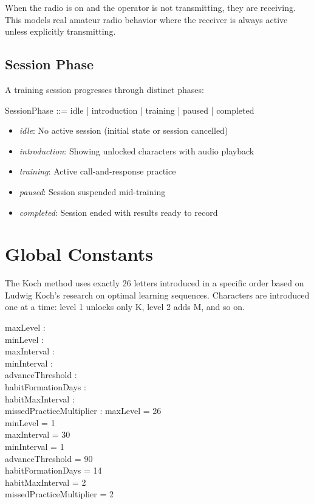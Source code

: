 \documentclass[a4paper,10pt,fleqn]{article}
\begin{document}
When the radio is on and the operator is not transmitting, they are receiving.
This models real amateur radio behavior where the receiver is always active
unless explicitly transmitting.

\subsection{Session Phase}

A training session progresses through distinct phases:

\begin{zed}
SessionPhase ::= idle | introduction | training | paused | completed
\end{zed}

\begin{itemize}
\item \emph{idle}: No active session (initial state or session cancelled)
\item \emph{introduction}: Showing unlocked characters with audio playback
\item \emph{training}: Active call-and-response practice
\item \emph{paused}: Session suspended mid-training
\item \emph{completed}: Session ended with results ready to record
\end{itemize}

\section{Global Constants}

The Koch method uses exactly 26 letters introduced in a specific order based on
Ludwig Koch's research on optimal learning sequences. Characters are introduced
one at a time: level 1 unlocks only K, level 2 adds M, and so on.

\begin{axdef}
maxLevel : \nat \\
minLevel : \nat \\
maxInterval : \nat \\
minInterval : \nat \\
advanceThreshold : \nat \\
habitFormationDays : \nat \\
habitMaxInterval : \nat \\
missedPracticeMultiplier : \nat
\where
maxLevel = 26 \\
minLevel = 1 \\
maxInterval = 30 \\
minInterval = 1 \\
advanceThreshold = 90 \\
habitFormationDays = 14 \\
habitMaxInterval = 2 \\
missedPracticeMultiplier = 2
\end{axdef}
\end{document}
